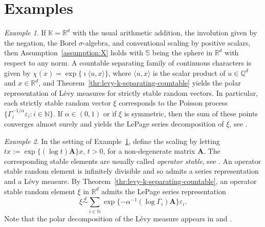 \documentclass[12pt]{amsart}
\numberwithin{equation}{section}
\numberwithin{figure}{section}
\theoremstyle{plain} \newtheorem{theorem}{Theorem}[section]
\theoremstyle{plain} \newtheorem{proposition}[theorem]{Proposition}
\theoremstyle{plain} \newtheorem{lemma}[theorem]{Lemma}
\theoremstyle{plain} \newtheorem{corollary}[theorem]{Corollary}
\theoremstyle{definition} \newtheorem{definition}[theorem]{Definition}
\theoremstyle{definition} \newtheorem{notation}[theorem]{Notation}
\theoremstyle{remark} \newtheorem{remark}[theorem]{Remark}
\theoremstyle{remark} \newtheorem{example}[theorem]{Example}
\theoremstyle{definition} \newtheorem{assumption}{Assumption}
\newcommand{\bK}{\mathbb{K}}
\newcommand{\bN}{\mathbb{N}}
\newcommand{\bQ}{\mathbb{Q}}
\newcommand{\bR}{\mathbb{R}}
\newcommand{\bS}{\mathbb{S}}
\renewcommand{\AA}{\mathbf{A}}
\renewcommand{\epsilon}{\varepsilon}
\newcommand{\eps}{\epsilon}
\newcommand{\eqd}{\overset{d}{\sim}}
\begin{document}
\section{Examples}
\label{sec:applications}

\begin{example}
  \label{example:Rd}
  If $\bK=\bR^d$ with the usual arithmetic addition, the involution given by
  the negation, the Borel $\sigma$-algebra, and conventional scaling
  by positive scalars, then Assumption~\ref{assumption:X} holds with
  $\bS$ being the sphere in $\bR^d$ with respect to any norm. A
  countable separating family of continuous characters is given by
  $\chi(x)=\exp\{\imath \langle u,x\rangle\}$, where $\langle
  u,x\rangle$ is the scalar product of $u\in\bQ^d$ and $x\in\bR^d$,
  and Theorem~\ref{thr:levy-k-separating-countable} yields the polar
  representation of L\'evy measures for strictly stable random
  vectors. In particular, each strictly stable random vector $\xi$
  corresponds to the Poisson process
  $\{\Gamma_i^{-1/\alpha}\eps_i:i\in\bN\}$. If $\alpha\in(0,1)$ or if
  $\xi$ is symmetric, then the sum of these points converges almost
  surely and yields the LePage series decomposition of $\xi$, see
  \cite{lep:wood:zin81}.
\end{example}

\begin{example}
  \label{ex:operator}
  In the setting of Example~\ref{example:Rd}, define the scaling by
  letting $tx:=\exp\{(\log t)\AA\}x$, $t>0$, for a non-degenerate
  matrix $\AA$. The corresponding stable elements are usually called
  \emph{operator stable}, see \cite{hud:mas81,shar69}. An operator
  stable random element is infinitely divisible and so admits a
  series representation and a L\'evy measure. By
  Theorem~\ref{thr:levy-k-separating-countable}, an operator stable
  random element $\xi$ in $\bR^d$ admits the LePage series
  representation
  \begin{displaymath}
    \xi\eqd \sum_{i\in\bN} \exp\{-\alpha^{-1}(\log\Gamma_i)\AA\} \eps_i. 
  \end{displaymath}
  Note that the polar decomposition of the L\'evy measure appears in
  \cite[Eq.~(2)]{hud:jur:veeh86} and \cite{hud:mas81}.
\end{example}
\end{document}

